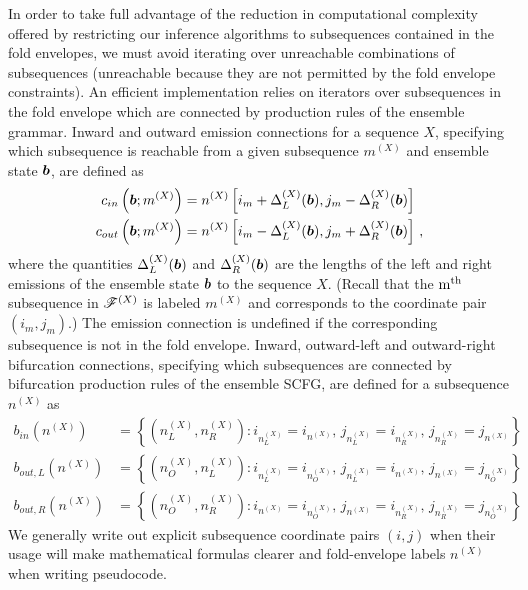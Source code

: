 \documentclass[10pt]{article}
\begin{document}
In order to take full advantage of the reduction in computational complexity offered by restricting our inference algorithms to subsequences contained in the fold envelopes, we must avoid iterating over unreachable combinations of subsequences (unreachable because they are not permitted by the fold envelope constraints).
An efficient implementation relies on iterators over subsequences in the fold envelope which are connected by production rules of the ensemble grammar.
Inward and outward emission connections for a sequence $X$, specifying which subsequence is reachable from 
a given subsequence $m^{(X)}$ and ensemble state $\boldsymbol{b}$, are defined as
\begin{align*}
c_{in}\left(\boldsymbol{b}; m^{(X)}\right) &= n^{(X)} \left[ i_{m} + \Delta^{(X)}_L(\boldsymbol{b}), j_{m} - \Delta^{(X)}_R(\boldsymbol{b}) \right] \\
c_{out}\left(\boldsymbol{b}; m^{(X)}\right) &= n^{(X)} \left[ i_{m} - \Delta^{(X)}_L(\boldsymbol{b}), j_{m} + \Delta^{(X)}_R(\boldsymbol{b}) \right] \, ,
\end{align*}
where the quantities $\Delta^{(X)}_L(\boldsymbol{b})$ and $\Delta^{(X)}_R(\boldsymbol{b})$ are the lengths of the left and right emissions of the ensemble state $\boldsymbol{b}$ to the sequence $X$.
(Recall that the $\mathrm{m}^{\mathrm{th}}$ subsequence in $\mathscr{F}^{(X)}$ is labeled $m^{(X)}$ and corresponds to the coordinate pair $(i_{m}, j_{m})$.)
The emission connection is undefined if the corresponding subsequence is not in the fold envelope.
Inward, outward-left and outward-right bifurcation connections, specifying which subsequences are connected by bifurcation production rules of the ensemble SCFG,
are defined for a subsequence $n^{(X)}$ as
\begin{align}
b_{in}(n^{(X)}) &= \left\{ \left( n^{(X)}_L,n^{(X)}_R \right): i_{n^{(X)}_L} = i_{n^{(X)}},\, j_{n^{(X)}_L} = i_{n^{(X)}_R},\, j_{n^{(X)}_R} = j_{n^{(X)}} \right\} \\
b_{out,L}(n^{(X)}) &= \left\{ \left( n^{(X)}_O,n^{(X)}_L \right): i_{n^{(X)}_L} = i_{n^{(X)}_O},\, j_{n^{(X)}_L} = i_{n^{(X)}},\, j_{n^{(X)}} = j_{n^{(X)}_O} \right\} \\
b_{out,R}(n^{(X)}) &= \left\{ \left( n^{(X)}_O,n^{(X)}_R \right): i_{n^{(X)}} = i_{n^{(X)}_O},\, j_{n^{(X)}} = i_{n^{(X)}_R},\, j_{n^{(X)}_R} = j_{n^{(X)}_O} \right\}
\end{align}
We generally write out explicit subsequence coordinate pairs $(i,j)$
when their usage will make mathematical formulas clearer and
fold-envelope labels $n^{(X)}$ when writing pseudocode.
\end{document}
